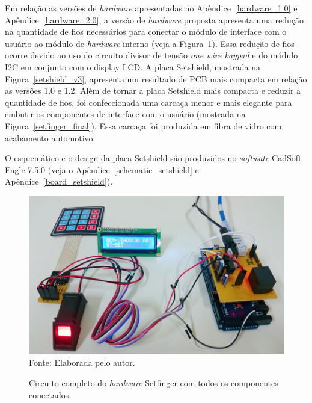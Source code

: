   Em relação as versões de \textit{hardware} apresentadas no Apêndice~\ref{hardware_1.0} e Apêndice~\ref{hardware_2.0}, a versão de \textit{hardware} proposta apresenta uma redução na quantidade de fios necessários para conectar o módulo de interface com o usuário ao módulo de \textit{hardware} interno (veja a Figura~\ref{circuit_setfinger_v3}). Essa redução de fios ocorre devido ao uso do circuito divisor de tensão \textit{one wire kaypad} e do módulo I2C em conjunto com o display LCD. A placa Setshield, mostrada na Figura~\ref{setshield_v3}, apresenta um resultado de PCB mais compacta em relação as versões 1.0 e 1.2. Além de tornar a placa Setshield mais compacta e reduzir a quantidade de fios, foi confeccionada uma carcaça menor e mais elegante para embutir os componentes de interface com o usuário (mostrada na Figura~\ref{setfinger_final}). Essa carcaça foi produzida em fibra de vidro com acabamento automotivo.
  
  O esquemático e o design da placa Setshield são produzidos no \textit{softwate} CadSoft Eagle 7.5.0 (veja o Apêndice~\ref{schematic_setshield} e Apêndice~\ref{board_setshield}).
  

\begin{figure}[!t]
  \begin{center}
  \caption{Circuito completo do \textit{hardware} Setfinger com todos os componentes conectados.}
  \includegraphics[scale=0.5]{figuras/cap4/circuit_setfinger_v3.jpg}\\
  Fonte: Elaborada pelo autor.
  \label{circuit_setfinger_v3}
  \end{center}
  \end{figure}
  
